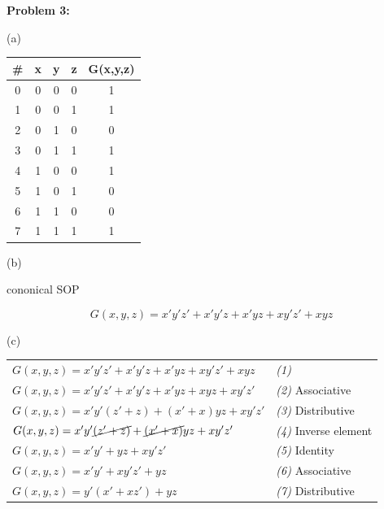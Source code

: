 \documentclass{article}
\begin{document}

    \textbf{Problem 3:}

    \quad (a)

    \begin{center}
        \begin{tabular} {cccc|c} 
            \# & x & y & z & G(x,y,z) \\
            \hline
            0 & 0 & 0 & 0 & 1 \\
            1 & 0 & 0 & 1 & 1 \\
            2 & 0 & 1 & 0 & 0 \\
            3 & 0 & 1 & 1 & 1 \\
            4 & 1 & 0 & 0 & 1 \\
            5 & 1 & 0 & 1 & 0 \\
            6 & 1 & 1 & 0 & 0 \\
            7 & 1 & 1 & 1 & 1 \\
        \end{tabular}
    \end{center}

    \quad (b)

    \quad\quad cononical SOP

    \begin{equation*}
        G(x,y,z) = x'y'z' + x'y'z + x'yz + xy'z' + xyz
    \end{equation*}

    \quad (c)

    \begin{center}
        \begin{tabularx} {1.2\textwidth} {
            >{\raggedright\arraybackslash}X
            >{\raggedright\arraybackslash}X }
    
            $G(x,y,z) = x'y'z' + x'y'z + x'yz + xy'z' + xyz$ & \emph{(1)} \\
            $G(x,y,z) = x'y'z' + x'y'z + x'yz + xyz + xy'z'$ & \emph{(2)} Associative \\
            $G(x,y,z) = x'y'(z'+ z) + (x'+x)yz + xy'z'$ & \emph{(3)} Distributive \\
            $G(x,y,z) = x'y'\cancel{(z'+ z)} + \cancel{(x'+x)}yz + xy'z'$ & \emph{(4)} Inverse element \\
            $G(x,y,z) = x'y' + yz + xy'z'$ & \emph{(5)} Identity \\
            $G(x,y,z) = x'y' + xy'z'+ yz$ & \emph{(6)} Associative \\
            $G(x,y,z) = y'(x' + xz')+ yz$ & \emph{(7)} Distributive \\

    
        \end{tabularx}
    \end{center}
\end{document}
